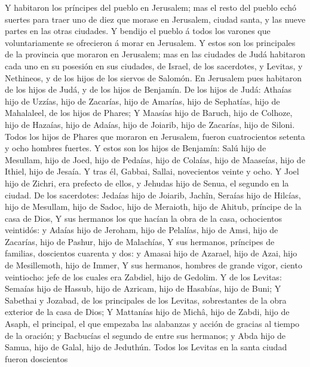  Y habitaron los príncipes del pueblo en Jerusalem; mas el
resto del pueblo echó suertes para traer uno de diez que morase en
Jerusalem, ciudad santa, y las nueve partes en las otras ciudades.
 Y bendijo el pueblo á todos los varones que voluntariamente
se ofrecieron á morar en Jerusalem.  Y estos son los
principales de la provincia que moraron en Jerusalem; mas en las
ciudades de Judá habitaron cada uno en su posesión en sus ciudades, de
Israel, de los sacerdotes, y Levitas, y Nethineos, y de los hijos de los
siervos de Salomón.  En Jerusalem pues habitaron de los
hijos de Judá, y de los hijos de Benjamín. De los hijos de Judá: Athaías
hijo de Uzzías, hijo de Zacarías, hijo de Amarías, hijo de Sephatías,
hijo de Mahalaleel, de los hijos de Phares;  Y Maasías hijo
de Baruch, hijo de Colhoze, hijo de Hazaías, hijo de Adaías, hijo de
Joiarib, hijo de Zacarías, hijo de Siloni.  Todos los hijos
de Phares que moraron en Jerusalem, fueron cuatrocientos setenta y ocho
hombres fuertes.  Y estos son los hijos de Benjamín: Salú
hijo de Mesullam, hijo de Joed, hijo de Pedaías, hijo de Colaías, hijo
de Maaseías, hijo de Ithiel, hijo de Jesaía.  Y tras él,
Gabbai, Sallai, novecientos veinte y ocho.  Y Joel hijo de
Zichri, era prefecto de ellos, y Jehudas hijo de Senua, el segundo en la
ciudad.  De los sacerdotes: Jedaías hijo de Joiarib,
Jachîn,  Seraías hijo de Hilcías, hijo de Mesullam, hijo de
Sadoc, hijo de Meraioth, hijo de Ahitub, príncipe de la casa de Dios,
 Y sus hermanos los que hacían la obra de la casa,
ochocientos veintidós: y Adaías hijo de Jeroham, hijo de Pelalías, hijo
de Amsi, hijo de Zacarías, hijo de Pashur, hijo de Malachías,
 Y sus hermanos, príncipes de familias, doscientos cuarenta
y dos: y Amasai hijo de Azarael, hijo de Azai, hijo de Mesillemoth, hijo
de Immer,  Y sus hermanos, hombres de grande vigor, ciento
veintiocho: jefe de los cuales era Zabdiel, hijo de Gedolim.
 Y de los Levitas: Semaías hijo de Hassub, hijo de Azricam,
hijo de Hasabías, hijo de Buni;  Y Sabethai y Jozabad, de
los principales de los Levitas, sobrestantes de la obra exterior de la
casa de Dios;  Y Mattanías hijo de Michâ, hijo de Zabdi,
hijo de Asaph, el principal, el que empezaba las alabanzas y acción de
gracias al tiempo de la oración; y Bacbucías el segundo de entre sus
hermanos; y Abda hijo de Samua, hijo de Galal, hijo de Jeduthún.
 Todos los Levitas en la santa ciudad fueron doscientos
